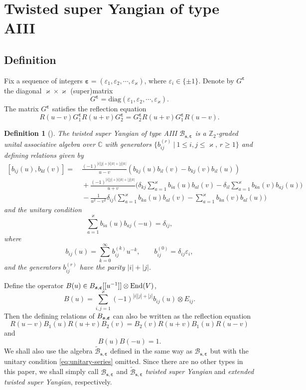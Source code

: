 \documentclass[11pt,reqno]{amsart}
\numberwithin{equation}{section}
\newtheorem{dfn}[thm]{Definition}
\theoremstyle{definition}
\theoremstyle{remark}
\newcommand{\beq}{\begin{equation}}
\newcommand{\eeq}{\end{equation}}
\newcommand{\C}{\mathbb{C}}
\newcommand{\Z}{\mathbb{Z}}
\newcommand{\End}{\mathrm{End}}
\newcommand{\gge}{\geqslant}
\newcommand{\lle}{\leqslant}
\newcommand{\ka}{\varkappa}
\newcommand{\ve}{\varepsilon}
\begin{document}
\section{Twisted super Yangian of type AIII}\label{sec:twisted-super-yangians}
\subsection{Definition}
Fix a sequence of integers $\bm\ve=(\ve_1,\ve_2,\cdots,\ve_\ka)$, where $\ve_i \in\{\pm 1\}$.
 Denote by $G^{\bm\ve}$ the diagonal $\ka\times \ka$ (super)matrix
\beq\label{eq:G}
G^{\bm\ve}=\mathrm{diag}(\ve_1,\ve_2,\cdots,\ve_\ka).
\eeq
The matrix $G^{\bm\ve}$ satisfies the reflection equation
\beq\label{eq:reflectG}
R(u-v)G^{\bm\ve}_1R(u+v)G^{\bm\ve}_2=G^{\bm\ve}_2R(u+v)G^{\bm\ve}_1R(u-v).
\eeq

\begin{dfn}[{\cite{Molev2002reflection,Ragoucy2007analytical,Belliard2009nested}}]
The twisted super Yangian  of type AIII $\mathscr B_{\bm s,\bm\ve}$ is a $\Z_2$-graded unital associative algebra over $\C$ with generators $\{b_{ij}^{(r)}\ |\ 1\lle i,j\lle \ka, \, r\gge 1\}$ and defining relations given by
\beq\label{eq:comm-series b}
\begin{split}
[b_{ij}(u),b_{kl}(v)]= & \ \frac{(-1)^{|i||j|+|i||k|+|j||k|}}{u-v}(b_{kj}(u)b_{il}(v)-b_{kj}(v)b_{il}(u))\\
&\ + \frac{(-1)^{|i||j|+|i||k|+|j||k|}}{u+v}\Big(\delta_{kj}\sum_{a=1}^\ka b_{ia}(u)b_{al}(v)-\delta_{il}\sum_{a=1}^\ka b_{ka}(v)b_{aj}(u)\Big)\\
&\ - \frac{1}{u^2-v^2}\delta_{ij}\Big(\sum_{a=1}^\ka b_{ka}(u)b_{al}(v)-\sum_{a=1}^\ka b_{ka}(v)b_{al}(u)\Big)
\end{split}
\eeq
and the unitary condition
\beq\label{eq:unitary-series}
\sum_{a=1}^\ka b_{ia}(u)b_{aj}(-u)=\delta_{ij},
\eeq
where
\[
b_{ij}(u)=\sum_{k=0}^\infty b_{ij}^{(k)}u^{-k},\qquad b_{ij}^{(0)}=\delta_{ij}\ve_i,
\]
and the generators $b_{ij}^{(r)}$ have the parity $|i|+|j|$.
\end{dfn}
Define the operator $B(u)\in \mathcal \mathscr B_{\bm s,\bm\ve}[[u^{-1}]] \otimes\End(V)$,
\beq\label{eq matrix notation b}
B(u)=\sum_{i,j=1}^\ka (-1)^{|i||j|+|j|} b_{ij}(u)\otimes E_{ij}.
\eeq
Then the defining relations of $\mathcal \mathscr B_{\bm s,\bm\ve}$ can also be written as the reflection equation
\beq\label{eq:comm-generators b}
R(u-v)B_1(u)R(u+v)B_2(v)=B_2(v)R(u+v)B_1(u)R(u-v)
\eeq
and
\beq\label{eq:unitary}
B(u)B(-u)=1.
\eeq
We shall also use the algebra $\widetilde{\mathscr B}_{\bm s,\bm\ve}$ defined in the same way as $\mathscr B_{\bm s,\bm\ve}$ but with the unitary condition \eqref{eq:unitary-series} omitted. Since there are no other types in this paper, we shall simply call $\mathscr B_{\bm s,\bm\ve}$ and $\widetilde{\mathscr B}_{\bm s,\bm\ve}$ {\it twisted super Yangian} and {\it extended twisted super Yangian}, respectively.
\end{document}
